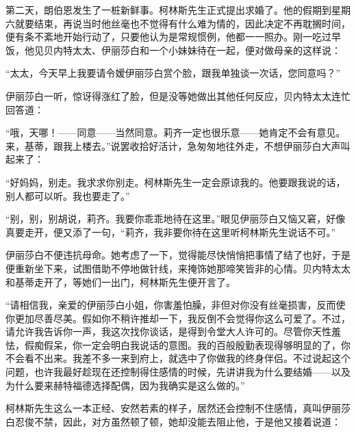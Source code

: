\par 第二天，朗伯恩发生了一桩新鲜事。柯林斯先生正式提出求婚了。他的假期到星期六就要结束，再说当时他丝毫也不觉得有什么难为情的，因此决定不再耽搁时间，便有条不紊地开始行动了，只要他认为是常规惯例，他都一一照办。刚一吃过早饭，他见贝内特太太、伊丽莎白和一个小妹妹待在一起，便对做母亲的这样说：
\par “太太，今天早上我要请令嫒伊丽莎白赏个脸，跟我单独谈一次话，您同意吗？”
\par 伊丽莎白一听，惊讶得涨红了脸，但是没等她做出其他任何反应，贝内特太太连忙回答道：
\par “哦，天哪！——同意——当然同意。莉齐一定也很乐意——她肯定不会有意见。来，基蒂，跟我上楼去。”说罢收拾好活计，急匆匆地往外走，不想伊丽莎白大声叫起来了：
\par “好妈妈，别走。我求求你别走。柯林斯先生一定会原谅我的。他要跟我说的话，别人都可以听。我也要走了。”
\par “别，别，别胡说，莉齐。我要你乖乖地待在这里。”眼见伊丽莎白又恼又窘，好像真要走开，便又添了一句，“莉齐，我非要你待在这里听柯林斯先生说话不可。”
\par 伊丽莎白不便违抗母命。她考虑了一下，觉得能尽快悄悄把事情了结了也好，于是便重新坐下来，试图借助不停地做针线，来掩饰她那啼笑皆非的心情。贝内特太太和基蒂走开了，等她们一出门，柯林斯先生便开言了。
\par “请相信我，亲爱的伊丽莎白小姐，你害羞怕臊，非但对你没有丝毫损害，反而使你更加尽善尽美。假如你不稍许推却一下，我反倒不会觉得你这么可爱了。不过，请允许我告诉你一声，我这次找你谈话，是得到令堂大人许可的。尽管你天性羞怯，假痴假呆，你一定会明白我说话的意图。我的百般殷勤表现得够明显的了，你不会看不出来。我差不多一来到府上，就选中了你做我的终身伴侣。不过说起这个问题，也许我最好趁现在还控制得住感情的时候，先讲讲我为什么要结婚——以及为什么要来赫特福德选择配偶，因为我确实是这么做的。”
\par 柯林斯先生这么一本正经、安然若素的样子，居然还会控制不住感情，真叫伊丽莎白忍俊不禁，因此，对方虽然顿了顿，她却没能去阻止他，于是他又接着说道：
